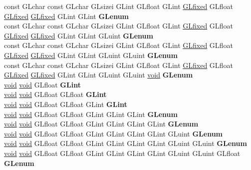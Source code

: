 \begin{DoxyCompactItemize}
\begin{tabbing}
\>const GLchar const GLchar GLsizei GLint GLfloat GLint \hyperlink{glheader_8h_ad6d3fa892df40dedf48ee6d84529ae5e}{GLfixed} GLfloat \hyperlink{glheader_8h_ad6d3fa892df40dedf48ee6d84529ae5e}{GLfixed} \hyperlink{glheader_8h_ad6d3fa892df40dedf48ee6d84529ae5e}{GLfixed} GLint GLint {\bfseries GLenum}\\
\>const GLchar const GLchar GLsizei GLint GLfloat GLint \hyperlink{glheader_8h_ad6d3fa892df40dedf48ee6d84529ae5e}{GLfixed} GLfloat \hyperlink{glheader_8h_ad6d3fa892df40dedf48ee6d84529ae5e}{GLfixed} \hyperlink{glheader_8h_ad6d3fa892df40dedf48ee6d84529ae5e}{GLfixed} GLint GLint GLuint {\bfseries GLenum}\\
\>const GLchar const GLchar GLsizei GLint GLfloat GLint \hyperlink{glheader_8h_ad6d3fa892df40dedf48ee6d84529ae5e}{GLfixed} GLfloat \hyperlink{glheader_8h_ad6d3fa892df40dedf48ee6d84529ae5e}{GLfixed} \hyperlink{glheader_8h_ad6d3fa892df40dedf48ee6d84529ae5e}{GLfixed} GLint GLint GLuint GLuint {\bfseries GLenum}\\
\>const GLchar const GLchar GLsizei GLint GLfloat GLint \hyperlink{glheader_8h_ad6d3fa892df40dedf48ee6d84529ae5e}{GLfixed} GLfloat \hyperlink{glheader_8h_ad6d3fa892df40dedf48ee6d84529ae5e}{GLfixed} \hyperlink{glheader_8h_ad6d3fa892df40dedf48ee6d84529ae5e}{GLfixed} GLint GLint GLuint GLuint \hyperlink{interfacevoid}{void} {\bfseries GLenum}\\
\>\hyperlink{interfacevoid}{void} \hyperlink{interfacevoid}{void} GLfloat {\bfseries GLint}\\
\>\hyperlink{interfacevoid}{void} \hyperlink{interfacevoid}{void} GLfloat GLfloat {\bfseries GLint}\\
\>\hyperlink{interfacevoid}{void} \hyperlink{interfacevoid}{void} GLfloat GLfloat GLint {\bfseries GLint}\\
\>\hyperlink{interfacevoid}{void} \hyperlink{interfacevoid}{void} GLfloat GLfloat GLint GLint GLint {\bfseries GLenum}\\
\>\hyperlink{interfacevoid}{void} \hyperlink{interfacevoid}{void} GLfloat GLfloat GLint GLint GLint GLint {\bfseries GLenum}\\
\>\hyperlink{interfacevoid}{void} \hyperlink{interfacevoid}{void} GLfloat GLfloat GLint GLint GLint GLint GLuint {\bfseries GLenum}\\
\>\hyperlink{interfacevoid}{void} \hyperlink{interfacevoid}{void} GLfloat GLfloat GLint GLint GLint GLint GLuint GLuint {\bfseries GLenum}\\
\>\hyperlink{interfacevoid}{void} \hyperlink{interfacevoid}{void} GLfloat GLfloat GLint GLint GLint GLint GLuint GLuint GLfloat {\bfseries GLenum}\\

\end{tabbing}
\end{DoxyCompactItemize}
